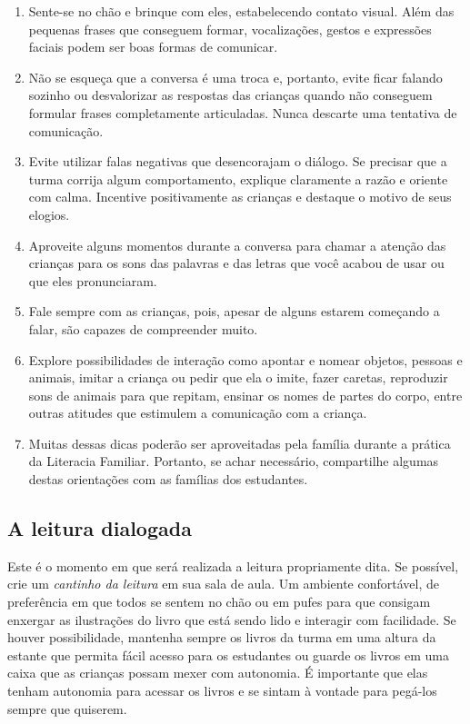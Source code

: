 \documentclass[11pt]{extarticle}
\begin{document}
\begin{enumerate}
\item Sente-se no chão e brinque com eles, estabelecendo 
contato visual. Além das pequenas frases que conseguem formar, vocalizações, 
gestos e expressões faciais podem ser boas formas de comunicar.

\item Não se esqueça que a conversa é uma troca e, portanto, 
evite ficar falando sozinho ou desvalorizar as respostas das 
crianças quando não conseguem formular frases completamente articuladas. 
Nunca descarte uma tentativa de comunicação. 

\item Evite utilizar falas negativas que desencorajam o diálogo. 
Se precisar que a turma 
corrija algum comportamento, explique claramente a razão e 
oriente com calma. Incentive positivamente as crianças e 
destaque o motivo de seus elogios. 

\item Aproveite alguns momentos durante a conversa para chamar 
a atenção das crianças para os sons das palavras e das letras que você 
acabou de usar ou que eles pronunciaram.  

\item Fale sempre com as crianças, pois, apesar de alguns estarem começando a falar,
são capazes de compreender muito.

\item Explore possibilidades de interação como apontar e 
nomear objetos, pessoas e animais, imitar a criança ou pedir que 
ela o imite, fazer caretas, reproduzir sons de 
animais para que repitam, ensinar os nomes de partes do corpo, 
entre outras atitudes que estimulem a comunicação com a criança. 

\item Muitas dessas dicas poderão ser aproveitadas pela 
família durante a prática da Literacia Familiar. Portanto, 
se achar necessário, compartilhe algumas destas orientações 
com as famílias dos estudantes.
\end{enumerate}


\subsection{A leitura dialogada}
Este é o momento em que será realizada a leitura propriamente dita. 
Se possível, crie um \textit{cantinho da leitura} em sua sala de aula. Um 
ambiente confortável, de preferência em que todos se sentem no chão ou 
em pufes para que consigam enxergar as ilustrações do livro que está 
sendo lido e interagir com facilidade. Se houver possibilidade, mantenha 
sempre os livros da turma em uma altura da estante que permita fácil 
acesso para os estudantes ou guarde os livros em uma caixa que as crianças 
possam mexer com autonomia. É importante que elas tenham autonomia para 
acessar os livros e se sintam à vontade para pegá-los sempre que quiserem. 
\end{document}
